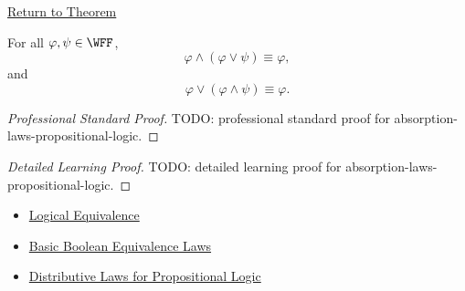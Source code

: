 \newpage
{}
\label{prf:absorption-laws-propositional-logic}

\begin{remark*}[Return]
\hyperref[thm:absorption-laws-propositional-logic]{Return to Theorem}
\end{remark*}

\begin{theorem*}
For all \(\varphi,\psi\in\WFF\),
\[
\varphi\land(\varphi\lor\psi)\equiv\varphi,
\]
and
\[
\varphi\lor(\varphi\land\psi)\equiv\varphi.
\]
\end{theorem*}

\begin{proof}[Professional Standard Proof]
\LRAProofBodyStart
TODO: professional standard proof for absorption-laws-propositional-logic.
\end{proof}

\begin{proof}[Detailed Learning Proof]
\LRAProofBodyStart
TODO: detailed learning proof for absorption-laws-propositional-logic.
\end{proof}

\begin{remark*}
\end{remark*}

\begin{dependencies}
\begin{itemize}
  \item \hyperref[def:logical-equivalence-propositional-logic]{Logical Equivalence}
  \item \hyperref[thm:basic-boolean-equivalence-laws-propositional-logic]{Basic Boolean Equivalence Laws}
  \item \hyperref[thm:distributive-laws-propositional-logic]{Distributive Laws for Propositional Logic}
\end{itemize}
\end{dependencies}

\clearpage

